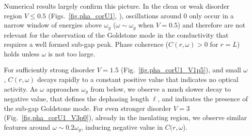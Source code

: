 \documentclass[Collective.tex]{revtex4-1}
\begin{document}
Numerical results largely confirm this picture. In the clean or weak disorder region $V \le 0.5$ (Figs.~\ref{fig.pha_corU1}, ), oscillations around $0$ only occur in a narrow window of energies above $\omega_g$ ($\omega \sim \omega_g$ when $V=0.5$) and therefore are not relevant for the observation of the Goldstone mode in the conductivity that requires a well formed sub-gap peak. Phase coherence ($C(r,\omega) > 0$ for $r = L$) holds unless $\omega$ is not too large.
% 

For sufficiently strong disorder $V = 1.5$ (Fig.~\ref{fig.pha_corU1_V1p5}), and small $\omega$, $C(r,\omega)$ decays rapidly to a constant positive value that indicates no optical activity. As $\omega$ approaches $\omega_g$ from below, we observe a much slower decay to negative value, that defines the dephasing length $\ell$, and indicates the presence of the sub-gap Goldstone mode. For even stronger disorder $V=3$ (Fig.~\ref{fig.pha_corU1_V3p0}), already in the insulating region, we observe similar features around $\omega \sim 0.2\omega_g$, inducing negative value in $C(r,\omega$).   
\end{document}
